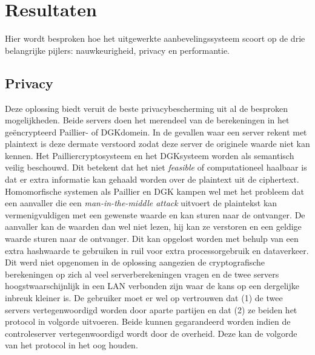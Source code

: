 \chapter{Resultaten}
Hier wordt besproken hoe het uitgewerkte aanbevelingssysteem scoort op de drie belangrijke pijlers: nauwkeurigheid, privacy en performantie.
\section{Privacy}
Deze oplossing biedt veruit de beste privacybescherming uit al de besproken mogelijkheden. Beide servers doen het merendeel van de berekeningen in het ge\"encrypteerd Paillier- of DGKdomein. In de gevallen waar een server rekent met plaintext is deze dermate verstoord zodat deze server de originele waarde niet kan kennen. Het Pailliercryptosysteem en het DGKsysteem worden als semantisch veilig beschouwd. Dit betekent dat het niet \emph{feasible} of computationeel haalbaar is dat er extra informatie kan gehaald worden over de plaintext uit de ciphertext. Homomorfische systemen als Paillier en DGK kampen wel met het probleem dat een aanvaller die een \emph{man-in-the-middle attack} uitvoert de plaintekst kan vermenigvuldigen met een gewenste waarde en kan sturen naar de ontvanger. De aanvaller kan de waarden dan wel niet lezen, hij kan ze verstoren en een geldige waarde sturen naar de ontvanger. Dit kan opgelost worden met behulp van een extra hashwaarde te gebruiken \cite{yi:homomorphic} in ruil voor extra processorgebruik en dataverkeer. Dit werd niet opgenomen in de oplossing aangezien de cryptografische berekeningen op zich al veel serverberekeningen vragen en de twee servers hoogstwaarschijnlijk in een LAN verbonden zijn waar de kans op een dergelijke inbreuk kleiner is.  De gebruiker moet er wel op vertrouwen dat (1) de twee servers vertegenwoordigd worden door aparte partijen en dat (2) ze beiden het protocol in volgorde uitvoeren. Beide kunnen gegarandeerd worden indien de controleserver vertegenwoordigd wordt door de overheid. Deze kan de volgorde van het protocol in het oog houden.
